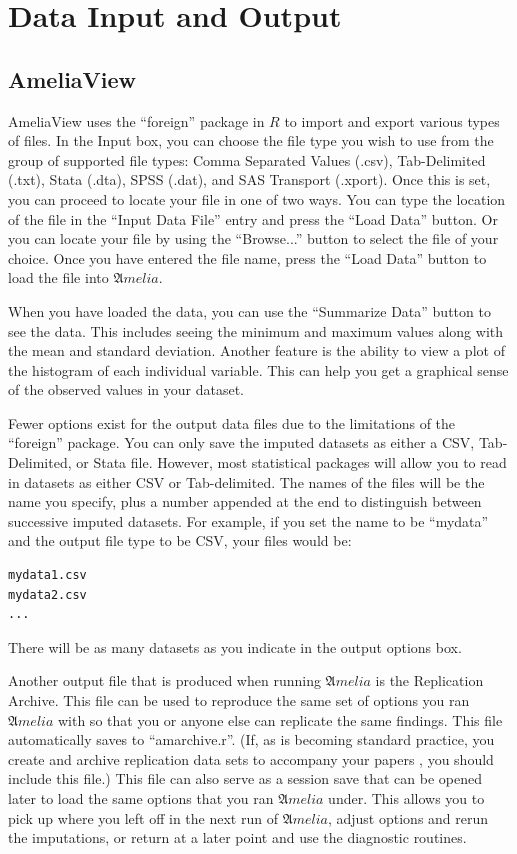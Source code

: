 \documentclass[12pt,titlepage]{article}
\begin{document}
\section{Data Input and Output}
\label{sec:data}

\subsection{AmeliaView}
\label{sec:data-gui}
AmeliaView uses the ``foreign'' package in $R$ to import and export
various types of files.  In the Input box, you can choose the file
type you wish to use from the group of supported file types: Comma
Separated Values (.csv), Tab-Delimited (.txt), Stata (.dta), SPSS
(.dat), and SAS Transport (.xport). Once this is set, you can proceed
to locate your file in one of two ways.  You can type the location of
the file in the ``Input Data File'' entry and press the ``Load Data''
button.  Or you can locate your file by using the ``Browse...'' button
to select the file of your choice.  Once you have entered the file
name, press the ``Load Data'' button to load the file into ${\mathfrak
  Amelia}$.

When you have loaded the data, you can use the ``Summarize Data''
button to see the data.  This includes seeing the minimum and maximum
values along with the mean and standard deviation.  Another feature is
the ability to view a plot of the histogram of each individual
variable.  This can help you get a graphical sense of the observed
values in your dataset.

Fewer options exist for the output data files due to the limitations
of the ``foreign'' package.  You can only save the imputed datasets as
either a CSV, Tab-Delimited, or Stata file. However, most statistical
packages will allow you to read in datasets as either CSV or
Tab-delimited.  The names of the files will be the name you specify,
plus a number appended at the end to distinguish between successive
imputed datasets.  For example, if you set the name to be ``mydata''
and the output file type to be CSV, your files would be:
\begin{verbatim}
mydata1.csv
mydata2.csv
...
\end{verbatim}
There will be as many datasets as you indicate in the output options
box.

Another output file that is produced when running ${\mathfrak Amelia}$
is the Replication Archive.  This file can be used to reproduce the
same set of options you ran ${\mathfrak Amelia}$ with so that you or
anyone else can replicate the same findings.  This file automatically
saves to ``amarchive.r''.  (If, as is becoming standard practice, you
create and archive replication data sets to accompany your papers
\citep{King95}, you should include this file.)  This file can also serve
as a session save that can be opened later to load the same options
that you ran ${\mathfrak Amelia}$ under.  This allows you to pick up
where you left off in the next run of ${\mathfrak Amelia}$, adjust
options and rerun the imputations, or return at a later point and use
the diagnostic routines.
\end{document}
